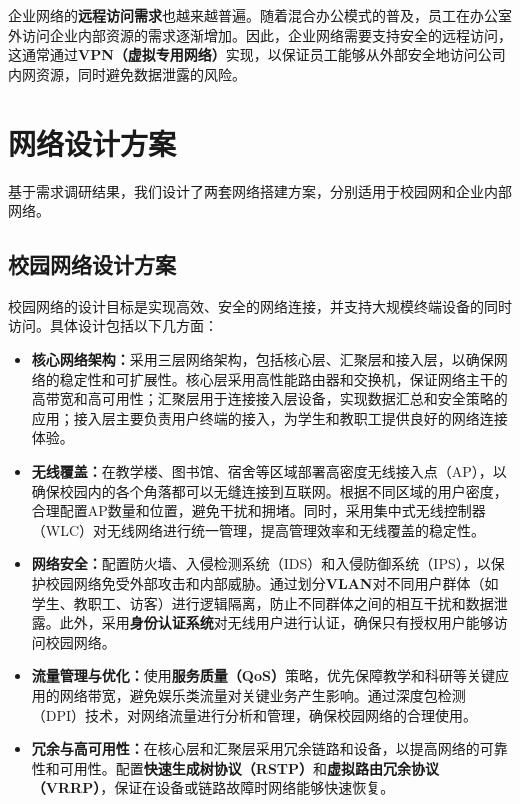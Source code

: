 \documentclass[12pt]{article}
\begin{document}
企业网络的\textbf{远程访问需求}也越来越普遍。随着混合办公模式的普及，员工在办公室外访问企业内部资源的需求逐渐增加。因此，企业网络需要支持安全的远程访问，这通常通过\textbf{VPN（虚拟专用网络）}实现，以保证员工能够从外部安全地访问公司内网资源，同时避免数据泄露的风险。

\section{网络设计方案}
基于需求调研结果，我们设计了两套网络搭建方案，分别适用于校园网和企业内部网络。

\subsection{校园网络设计方案}
校园网络的设计目标是实现高效、安全的网络连接，并支持大规模终端设备的同时访问。具体设计包括以下几方面：

\begin{itemize}
    \item \textbf{核心网络架构：}采用三层网络架构，包括核心层、汇聚层和接入层，以确保网络的稳定性和可扩展性。核心层采用高性能路由器和交换机，保证网络主干的高带宽和高可用性；汇聚层用于连接接入层设备，实现数据汇总和安全策略的应用；接入层主要负责用户终端的接入，为学生和教职工提供良好的网络连接体验。
    \item \textbf{无线覆盖：}在教学楼、图书馆、宿舍等区域部署高密度无线接入点（AP），以确保校园内的各个角落都可以无缝连接到互联网。根据不同区域的用户密度，合理配置AP数量和位置，避免干扰和拥堵。同时，采用集中式无线控制器（WLC）对无线网络进行统一管理，提高管理效率和无线覆盖的稳定性。
    \item \textbf{网络安全：}配置防火墙、入侵检测系统（IDS）和入侵防御系统（IPS），以保护校园网络免受外部攻击和内部威胁。通过划分\textbf{VLAN}对不同用户群体（如学生、教职工、访客）进行逻辑隔离，防止不同群体之间的相互干扰和数据泄露。此外，采用\textbf{身份认证系统}对无线用户进行认证，确保只有授权用户能够访问校园网络。
    \item \textbf{流量管理与优化：}使用\textbf{服务质量（QoS）}策略，优先保障教学和科研等关键应用的网络带宽，避免娱乐类流量对关键业务产生影响。通过深度包检测（DPI）技术，对网络流量进行分析和管理，确保校园网络的合理使用。
    \item \textbf{冗余与高可用性：}在核心层和汇聚层采用冗余链路和设备，以提高网络的可靠性和可用性。配置\textbf{快速生成树协议（RSTP）}和\textbf{虚拟路由冗余协议（VRRP）}，保证在设备或链路故障时网络能够快速恢复。
\end{itemize}
\end{document}
